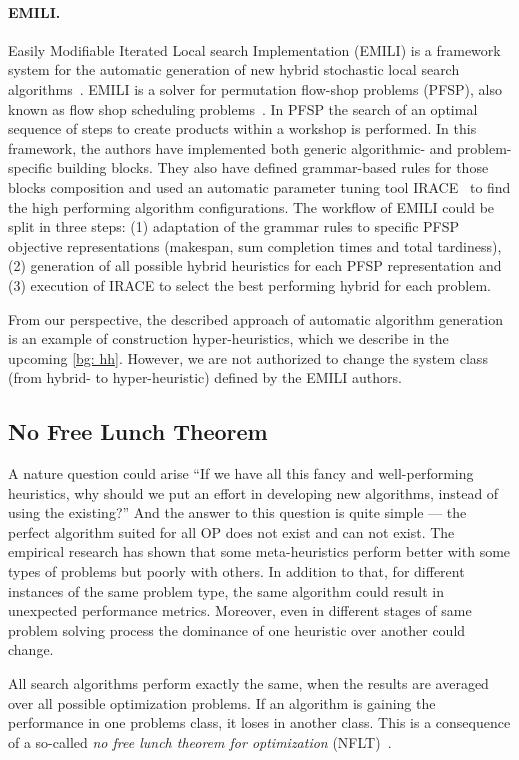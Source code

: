 \paragraph{EMILI.}
Easily Modifiable Iterated Local search Implementation (EMILI) is a framework system for the automatic generation of new hybrid stochastic local search algorithms~\cite{pagnozzi2019automatic}. EMILI is a solver for permutation flow-shop problems (PFSP), also known as flow shop scheduling problems~\cite{reza2005flowshop}. In PFSP the search of an optimal sequence of steps to create products within a workshop is performed.
In this framework, the authors have implemented both generic algorithmic- and problem-specific building blocks. They also have defined grammar-based rules for those blocks composition and used an automatic parameter tuning tool IRACE~\cite{lopez2016irace} to find the high performing algorithm configurations. The workflow of EMILI could be split in three steps: (1) adaptation of the grammar rules to specific PFSP objective representations (makespan, sum completion times and total tardiness), (2) generation of all possible hybrid heuristics for each PFSP representation and (3) execution of IRACE to select the best performing hybrid for each problem. 

From our perspective, the described approach of automatic algorithm generation is an example of construction hyper-heuristics, which we describe in the upcoming \cref{bg: hh}. However, we are not authorized to change the system class (from hybrid- to hyper-heuristic) defined by the EMILI authors.


\subsection{No Free Lunch Theorem}
A nature question could arise ``If we have all this fancy and well-performing heuristics, why should we put an effort in developing new algorithms, instead of using the existing?'' And the answer to this question is quite simple — the perfect algorithm suited for all OP does not exist and can not exist. 
The empirical research has shown that some meta-heuristics perform better with some types of problems but poorly with others. In addition to that, for different instances of the same problem type, the same algorithm could result in unexpected performance metrics. Moreover, even in different stages of same problem solving process the dominance of one heuristic over another could change. 

All search algorithms perform exactly the same, when the results are averaged over all possible optimization problems. If an algorithm is gaining the performance in one problems class, it loses in another class. This is a consequence of a so-called \emph{no free lunch theorem for optimization} (NFLT)~\cite{wolpert1997no}.

